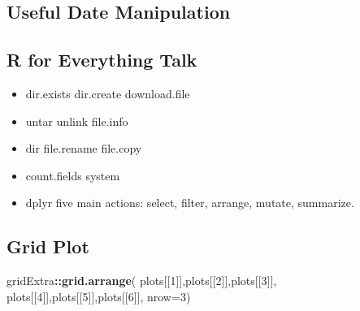\documentclass[]{book}
\newenvironment{Shaded}{\begin{snugshade}}{\end{snugshade}}
\newcommand{\KeywordTok}[1]{\textcolor[rgb]{0.13,0.29,0.53}{\textbf{#1}}}
\newcommand{\DataTypeTok}[1]{\textcolor[rgb]{0.13,0.29,0.53}{#1}}
\newcommand{\DecValTok}[1]{\textcolor[rgb]{0.00,0.00,0.81}{#1}}
\newcommand{\StringTok}[1]{\textcolor[rgb]{0.31,0.60,0.02}{#1}}
\newcommand{\OperatorTok}[1]{\textcolor[rgb]{0.81,0.36,0.00}{\textbf{#1}}}
\newcommand{\NormalTok}[1]{#1}
\theoremstyle{definition}
\theoremstyle{definition}
\theoremstyle{definition}
\theoremstyle{remark}
\begin{document}
\subsection{Useful Date Manipulation}\label{useful-date-manipulation}

\begin{Shaded}
\end{Shaded}

\subsection{R for Everything Talk}\label{r-for-everything-talk}

\begin{itemize}
\item
  dir.exists \textbar{} dir.create \textbar{} download.file
\item
  untar \textbar{} unlink \textbar{} file.info
\item
  dir \textbar{} file.rename \textbar{} file.copy
\item
  count.fields \textbar{} system
\item
  dplyr five main actions: select, filter, arrange, mutate, summarize.
\end{itemize}

\subsection{Grid Plot}\label{grid-plot}

\begin{Shaded}
\begin{Highlighting}[]
\NormalTok{gridExtra}\OperatorTok{::}\KeywordTok{grid.arrange}\NormalTok{(}
\NormalTok{  plots[[}\DecValTok{1}\NormalTok{]],plots[[}\DecValTok{2}\NormalTok{]],plots[[}\DecValTok{3}\NormalTok{]],}
\NormalTok{  plots[[}\DecValTok{4}\NormalTok{]],plots[[}\DecValTok{5}\NormalTok{]],plots[[}\DecValTok{6}\NormalTok{]], }\DataTypeTok{nrow=}\DecValTok{3}\NormalTok{)}
\end{Highlighting}
\end{Shaded}
\end{document}

